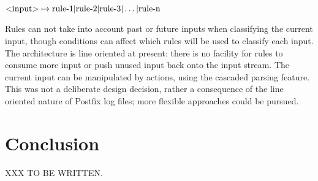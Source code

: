 $\text{\textless{}input\textgreater{}} \mapsto \text{rule-1} |
\text{rule-2} | \text{rule-3} | \dots | \text{rule-n}$

Rules can not take into account past or future inputs when classifying the
current input, though conditions can affect which rules will be used to
classify each input.  The architecture is line oriented at present: there
is no facility for rules to consume more input or push unused input back
onto the input stream.  The current input can be manipulated by actions,
using the cascaded parsing feature.  This was not a deliberate design
decision, rather a consequence of the line oriented nature of Postfix log
files; more flexible approaches could be pursued.

\section{Conclusion}

XXX TO BE WRITTEN\@.
